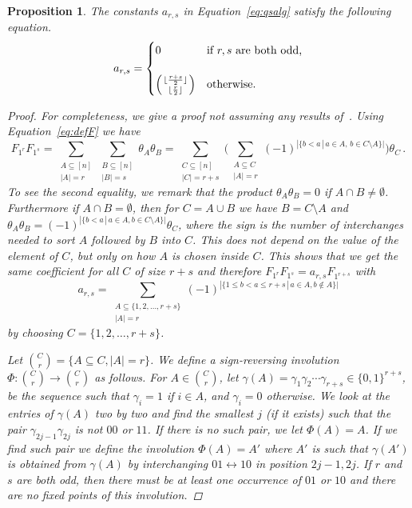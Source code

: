 \documentclass[11pt]{amsart}
\newtheorem{prop}[theorem]{Proposition}
\theoremstyle{definition}
\numberwithin{equation}{section}
\begin{document}
\begin{prop}\label{prop:comm}
The constants $a_{r,s}$ in Equation~\eqref{eq:qsalg} satisfy the following equation.
$$ a_{r,s}=
\begin{cases}
	0  &\text{if $r,s$ are both odd,}\\
	\\
	\left({\lfloor \frac{r+s}{2} \rfloor \atop \lfloor \frac{r}{2} \rfloor}\right)&\text{otherwise.}
\end{cases}
$$

\begin{proof}
For completeness, we give a proof not assuming any results of~\cite{FLP}. Using Equation~\eqref{eq:defF} we have
$$F_{1^r}F_{1^s}= \sum_{\substack{A \subseteq [n]\\|A|=r}}  \sum_{\substack{B \subseteq [n]\\|B|=s}} \theta_A \theta_B
= \sum_{\substack{C \subseteq [n]\\|C|=r+s}} \Big(\sum_{\substack{A\subseteq C \\|A|=r}} (-1)^{|\{b<a\,|\,a\in A,\, b\in C\setminus A\}|} \Big) \theta_C\,.
$$
To see the second equality, we remark that the product $\theta_A\theta_B=0$ if $A\cap B\ne \emptyset$. Furthermore if $A\cap B= \emptyset$, then for $C=A\cup B$
we have $B=C\setminus A$ and  $\theta_A\theta_B=(-1)^{|\{b<a\,|\,a\in A, b\in C\setminus A\}|} \theta_C$, where the sign is the number of interchanges needed to sort $A$ followed by $B$ into $C$.
This does not depend on the value of the element of $C$, but only on how $A$ is chosen inside $C$. This shows that we get the same coefficient for all $C$ of size $r+s$ and therefore $F_{1^r} F_{1^s} = a_{r,s} F_{1^{r+s}}$ with
\begin{equation}\label{eq:signa}
a_{r,s}=\sum_{\substack{A\subseteq \{1,2,\ldots, r+s\}\\ |A|=r}}
(-1)^{|\{1\le b<a\le r+s\,|\,a\in A, b\not\in A\}|}
\end{equation}
by choosing $C=\{1,2,\ldots,r+s\}$.

Let ${C\choose r}=\{A\subseteq C, |A|=r\}$. We define a sign-reversing involution $\Phi\colon {C\choose r}\to{C\choose r}$ as follows.
For $A\in  {C\choose r}$, let $\gamma(A)=\gamma_1\gamma_2\cdots\gamma_{r+s}\in\{0,1\}^{r+s}$, be the sequence such that
 $\gamma_i=1$ if $i\in A$, and $\gamma_i=0$ otherwise.
 We look at the  entries of  $\gamma(A)$ two by two and find the smallest $j$ (if it exists) such that the  pair
 $\gamma_{2j-1}\gamma_{2j}$ is not $00$ or $11$. If there is no such pair, we let $\Phi(A)=A$.   If we find such pair we define the involution $\Phi(A)=A'$ where $A'$ is such that $\gamma(A')$ is obtained from $\gamma(A)$ by interchanging $01\leftrightarrow 10$ in position $2j-1,2j$. If $r$ and $s$ are both odd, then there must be at least one occurrence of $01$ or $10$ and there are no fixed points of this involution.


\end{proof}
\end{prop}
\end{document}
